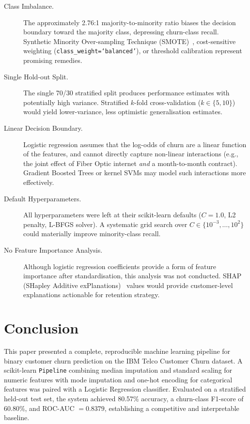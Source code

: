 \documentclass{llncs}
\begin{document}
\begin{description}
  \item[Class Imbalance.] The approximately 2.76:1 majority-to-minority
  ratio biases the decision boundary toward the majority class, depressing
  churn-class recall. Synthetic Minority Over-sampling
  Technique (SMOTE)~\cite{chawla2002smote}, cost-sensitive weighting
  (\texttt{class\_weight=`balanced'}), or threshold calibration represent
  promising remedies.

  \item[Single Hold-out Split.] The single 70/30 stratified split
  produces performance estimates with potentially high variance.
  Stratified $k$-fold cross-validation ($k \in \{5, 10\}$) would yield
  lower-variance, less optimistic generalisation estimates.

  \item[Linear Decision Boundary.] Logistic regression assumes that the
  log-odds of churn are a linear function of the features, and cannot
  directly capture non-linear interactions (e.g., the joint effect of
  Fiber Optic internet \emph{and} a month-to-month contract).
  Gradient Boosted Trees or kernel SVMs may model such interactions
  more effectively.

  \item[Default Hyperparameters.] All hyperparameters were left at their
  scikit-learn defaults ($C = 1.0$, L2 penalty, L-BFGS solver).
  A systematic grid search over $C \in \{10^{-3}, \ldots, 10^{2}\}$
  could materially improve minority-class recall.

  \item[No Feature Importance Analysis.] Although logistic regression
  coefficients provide a form of feature importance after standardisation,
  this analysis was not conducted.
  SHAP (SHapley Additive exPlanations)~\cite{lundberg2017unified} values
  would provide customer-level explanations actionable for retention strategy.
\end{description}

\section{Conclusion}
\label{sec:conclusion}

This paper presented a complete, reproducible machine learning pipeline
for binary customer churn prediction on the IBM Telco Customer Churn
dataset. A scikit-learn \texttt{Pipeline} combining median imputation and
standard scaling for numeric features with mode imputation and one-hot
encoding for categorical features was paired with a Logistic Regression
classifier. Evaluated on a stratified held-out test set, the system
achieved 80.57\% accuracy, a churn-class F1-score of 60.80\%, and
ROC-AUC $= 0.8379$, establishing a competitive and interpretable baseline.
\end{document}
